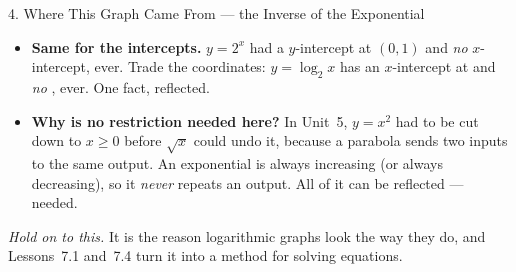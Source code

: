 \documentclass[10pt]{article}
\begin{document}
\begin{notesbox}{4. Where This Graph Came From --- the Inverse of the Exponential}
\begin{itemize}[leftmargin=1.5em, itemsep=3pt]
        logarithm's \emph{vertical} asymptote. It is the same boundary, seen sideways.
  \item \textbf{Same for the intercepts.} $y=2^x$ had a $y$-intercept at $(0,1)$ and \emph{no}
        $x$-intercept, ever. Trade the coordinates: $y=\log_2 x$ has an $x$-intercept at
         and \emph{no} , ever. One fact, reflected.
  \item \textbf{Why is no restriction needed here?} In Unit~5, $y=x^2$ had to be cut down to $x\ge0$
        before $\sqrt{x}$ could undo it, because a parabola sends two inputs to the same output. An
        exponential is always increasing (or always decreasing), so it \emph{never} repeats an
        output. All of it can be reflected ---  needed.
\end{itemize}
\emph{Hold on to this.} It is the reason logarithmic graphs look the way they do, and Lessons~7.1
and~7.4 turn it into a method for solving equations.
\end{notesbox}
\end{document}
